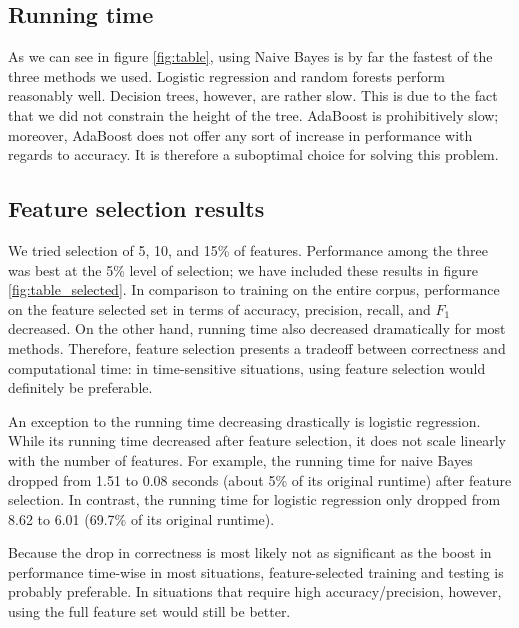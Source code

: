 \documentclass{article} %
\begin{document}
\subsection{Running time}
As we can see in figure \ref{fig:table}, using Naive Bayes is by far the fastest of the three methods we used. Logistic regression and random forests perform reasonably well. Decision trees, however, are rather slow. This is due to the fact that we did not constrain the height of the tree. AdaBoost is prohibitively slow; moreover, AdaBoost does not offer any sort of increase in performance with regards to accuracy. It is therefore a suboptimal choice for solving this problem. 

\subsection{Feature selection results}
We tried selection of 5, 10, and 15\% of features. Performance among the three was best at the 5\% level of selection; we have included these results in figure \ref{fig:table_selected}. In comparison to training on the entire corpus, performance on the feature selected set in terms of accuracy, precision, recall, and $F_1$ decreased. On the other hand, running time also decreased dramatically for most methods. Therefore, feature selection presents a tradeoff between correctness and computational time: in time-sensitive situations, using feature selection would definitely be preferable. 

An exception to the running time decreasing drastically is logistic regression. While its running time decreased after feature selection, it does not scale linearly with the number of features. For example, the running time for naive Bayes dropped from 1.51 to 0.08 seconds (about 5\% of its original runtime) after feature selection. In contrast, the running time for logistic regression only dropped from 8.62 to 6.01 (69.7\% of its original runtime). 

Because the drop in correctness is most likely not as significant as the boost in performance time-wise in most situations, feature-selected training and testing is probably preferable. In situations that require high accuracy/precision, however, using the full feature set would still be better. 
\end{document}

